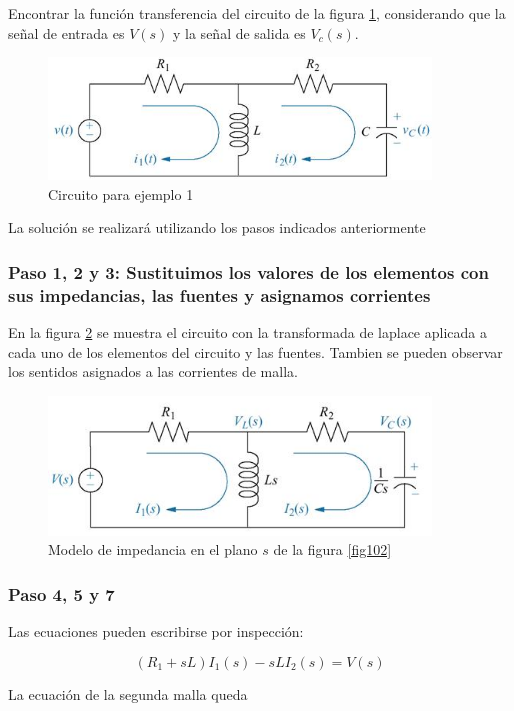 \documentclass[12pt]{book}
\theoremstyle{definition}
\theoremstyle{remark}
\theoremstyle{plain}
\begin{document}
Encontrar la función transferencia del circuito de la figura \ref{fig303}, considerando que la señal de entrada es $V(s)$ y la señal de salida es $V_c(s)$.

\begin{figure}
\centering
\includegraphics[width=4in]{circuito1.jpg}
\caption{Circuito para ejemplo 1}
\label{fig303}
\end{figure}

La solución se realizará utilizando los pasos indicados anteriormente 
\subsubsection{Paso 1, 2 y 3: Sustituimos los valores de los elementos con sus impedancias, las fuentes y asignamos corrientes}
En la figura \ref{fig304} se muestra el circuito con la transformada de laplace aplicada a cada uno de los elementos del circuito y las fuentes. Tambien se pueden observar los sentidos asignados a las corrientes de malla.
\begin{figure}
\centering
\includegraphics[width=4in]{circuito1planos.jpg}
\caption{Modelo de impedancia en el plano $s$ de la figura \ref{fig102}}
\label{fig304}
\end{figure}

\subsubsection{Paso 4, 5 y 7}
Las ecuaciones pueden escribirse por inspección:

\begin{equation}
\label{equ306}
(R_1+s L) I_1 (s)- s L I_2 (s) = V(s) 
\end{equation}

La ecuación de la segunda malla queda
\end{document}
